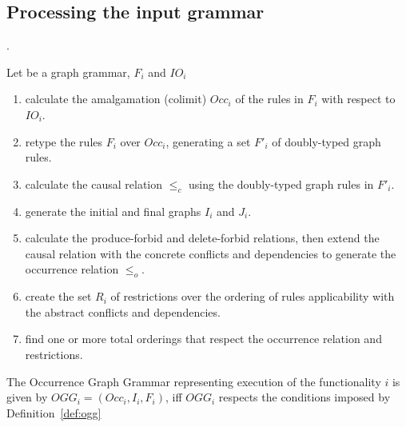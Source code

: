 \subsection{Processing the input grammar}

.

\begin{definition}\label{def:ogg-construction} Let \graphGrammar{} be a graph grammar, $F_i$ and $IO_i$

\begin{enumerate}
  \item\label{enum:construction-colimit} calculate the amalgamation (colimit) $Occ_i$ of the rules in $F_i$ with respect to $IO_i$.

\hfill\break

\item retype the rules $F_i$ over $Occ_i$, generating a set $F'_i$ of doubly-typed graph rules.

\item calculate the causal relation $\leq_{c}$ using the doubly-typed graph rules in $F'_i$.
\item\label{enum:construction-graphs} generate the initial and final graphs $I_i$ and $J_i$.
\item\label{enum:construction-occurrence} calculate the produce-forbid and delete-forbid relations, then extend the causal relation with the concrete conflicts and dependencies to generate the occurrence relation $\leq_o$.
\item\label{enum:construction-restriction} create the set $R_i$ of restrictions over the ordering of rules applicability with the abstract conflicts and dependencies.
\item find one or more total orderings that respect the occurrence relation and restrictions.
\end{enumerate}

  The Occurrence Graph Grammar representing execution of the functionality $i$ is given by $OGG_i = (Occ_i, I_i,F_i)$, iff $OGG_i$ respects the conditions imposed by Definition~\ref{def:ogg} 
\end{definition}

